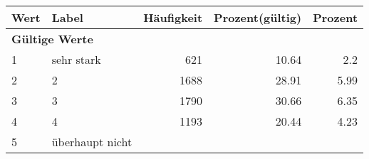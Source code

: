      \begin{longtable}{lXrrr}
     \toprule
     \textbf{Wert} & \textbf{Label} & \textbf{Häufigkeit} & \textbf{Prozent(gültig)} & \textbf{Prozent} \\
     \endhead
     \midrule
     \multicolumn{5}{l}{\textbf{Gültige Werte}}\\

     1 &
     \multicolumn{1}{X}{ sehr stark   } &


       \num{621} &
       \num[round-mode=places,round-precision=2]{10.64} &
         \num[round-mode=places,round-precision=2]{2.2} \\

     2 &
     \multicolumn{1}{X}{ 2   } &


       \num{1688} &
       \num[round-mode=places,round-precision=2]{28.91} &
         \num[round-mode=places,round-precision=2]{5.99} \\

     3 &
     \multicolumn{1}{X}{ 3   } &


       \num{1790} &
       \num[round-mode=places,round-precision=2]{30.66} &
         \num[round-mode=places,round-precision=2]{6.35} \\

     4 &
     \multicolumn{1}{X}{ 4   } &


       \num{1193} &
       \num[round-mode=places,round-precision=2]{20.44} &
         \num[round-mode=places,round-precision=2]{4.23} \\

     5 &
     \multicolumn{1}{X}{ überhaupt nicht   } &



\end{longtable}
